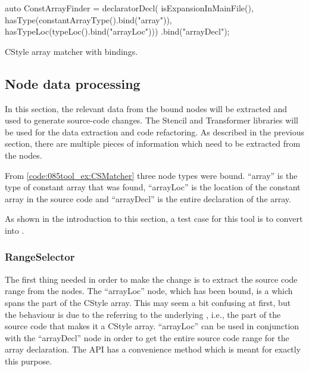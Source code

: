 \begin{listing}[H]
    \begin{cppcode}
auto ConstArrayFinder = 
    declaratorDecl(
        isExpansionInMainFile(),
        hasType(constantArrayType().bind("array")),
        hasTypeLoc(typeLoc().bind("arrayLoc")))
    .bind("arrayDecl");
    \end{cppcode}
    \caption{CStyle array matcher with bindings.}
    \label{code:085tool_ex:CSMatcher}
\end{listing}

\subsection{Node data processing}

In this section, the relevant data from the bound nodes will be extracted and used to generate source-code changes. The Stencil and Transformer libraries will be used for the data extraction and code refactoring.
As described in the previous section, there are multiple pieces of information which need to be extracted from the nodes. 

From \cref{code:085tool_ex:CSMatcher} three node types were bound. ``array'' is the type of constant array that was found, ``arrayLoc'' is the location of the constant array in the source code and ``arrayDecl'' is the entire declaration of the array.

As shown in the introduction to this section, a test case for this tool is to convert  into .

\subsubsection*{RangeSelector}
The first thing needed in order to make the change is to extract the source code range from the nodes. The ``arrayLoc'' node, which has been bound, is a  which spans the  part of the CStyle array.
This may seem a bit confusing at first, but the behaviour is due to the  referring to the underlying , i.e., the part of the source code that makes it a CStyle array.
``arrayLoc'' can be used in conjunction with the ``arrayDecl'' node in order to get the entire source code range for the array declaration. The  API has a convenience method  which is meant for exactly this purpose.

